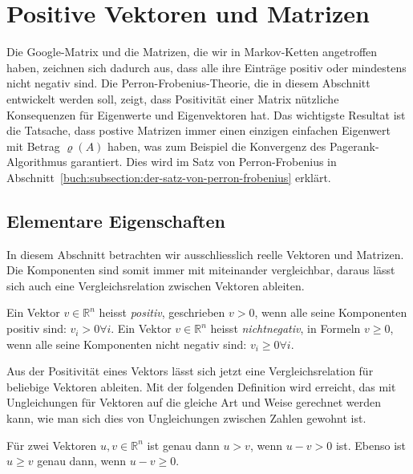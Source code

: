 %
%
%
\section{Positive Vektoren und Matrizen
\label{buch:section:positive-vektoren-und-matrizen}}
Die Google-Matrix und die Matrizen, die wir in Markov-Ketten angetroffen
haben, zeichnen sich dadurch aus, dass alle ihre Einträge positiv oder
mindestens nicht negativ sind.
Die Perron-Frobenius-Theorie, die in diesem Abschnitt entwickelt
werden soll, zeigt, dass Positivität einer Matrix nützliche
Konsequenzen für Eigenwerte und Eigenvektoren hat.
Das wichtigste Resultat ist die Tatsache, dass postive Matrizen immer
einen einzigen einfachen Eigenwert mit Betrag $\varrho(A)$ haben,
was zum Beispiel die Konvergenz des Pagerank-Algorithmus garantiert.
Dies wird im Satz von Perron-Frobenius in
Abschnitt~\ref{buch:subsection:der-satz-von-perron-frobenius}
erklärt.

%
%
\subsection{Elementare Eigenschaften
\label{buch:subsection:elementare-eigenschaften}}
In diesem Abschnitt betrachten wir ausschliesslich reelle Vektoren
und Matrizen.
Die Komponenten sind somit immer mit miteinander vergleichbar, daraus
lässt sich auch eine Vergleichsrelation zwischen Vektoren
ableiten.

\begin{definition}
Ein Vektor $v\in\mathbb{R}^n$ heisst {\em positiv}, geschrieben
$v>0$, wenn alle seine Komponenten positiv sind: $v_i>0\forall i$.
Ein Vektor $v\in\mathbb{R}^n$ heisst {\em nichtnegativ}, in Formeln
$v\ge 0$, wenn alle
seine Komponenten nicht negativ sind: $v_i\ge 0\forall i$.
%
%
\end{definition}

Aus der Positivität eines Vektors lässt sich jetzt eine Vergleichsrelation
für beliebige Vektoren ableiten.
Mit der folgenden Definition wird erreicht, das mit Ungleichungen für Vektoren
auf die gleiche Art und Weise gerechnet werden kann, wie man sich
dies von Ungleichungen zwischen Zahlen gewohnt ist.

\begin{definition}
Für zwei Vektoren $u,v\in\mathbb{R}^n$ ist genau dann $u>v$, wenn
$u-v > 0$ ist.
Ebenso ist $u\ge v$ genau dann, wenn $u-v\ge 0$.
\end{definition}


